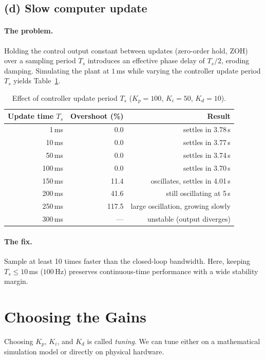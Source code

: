 \documentclass[10pt]{article}
\begin{document}
	\subsection{(d) Slow computer update}
	\paragraph{The problem.}
	Holding the control output constant between updates (zero-order hold, ZOH) over a sampling period $T_s$ introduces an effective phase delay of $T_s/2$, eroding damping. Simulating the plant at $1$\,ms while varying the controller update period $T_s$ yields Table~\ref{tab:ts}.
	
	\begin{table}[h]
		\centering
		\small
		\begin{tabular}{@{}rrr@{}}
			\toprule
			Update time $T_s$ & Overshoot (\%) & Result \\
			\midrule
			1\,ms   & 0.0 & settles in 3.78\,s \\
			10\,ms  & 0.0 & settles in 3.77\,s \\
			50\,ms  & 0.0 & settles in 3.74\,s \\
			100\,ms & 0.0 & settles in 3.70\,s \\
			150\,ms & 11.4 & oscillates, settles in 4.01\,s \\
			200\,ms & 41.6 & still oscillating at 5\,s \\
			250\,ms & 117.5 & large oscillation, growing slowly \\
			300\,ms & --- & unstable (output diverges) \\
			\bottomrule
		\end{tabular}
		\caption{Effect of controller update period $T_s$ ($K_p=100$, $K_i=50$, $K_d=10$).}
		\label{tab:ts}
	\end{table}
	
	\paragraph{The fix.}
	Sample at least 10 times faster than the closed-loop bandwidth. Here, keeping $T_s \le 10$\,ms ($100$\,Hz) preserves continuous-time performance with a wide stability margin.
	

	\section{Choosing the Gains}
	Choosing $K_p$, $K_i$, and $K_d$ is called \emph{tuning}. We can tune either on a mathematical simulation model or directly on physical hardware.
	
\end{document}
